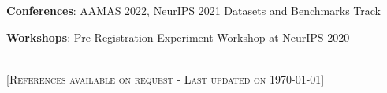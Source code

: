 \documentclass[]{lukas-cv-openfont}
\begin{document}
\noindent
\begin{tightitemize}{1.0em}
\item \textbf{Conferences}: AAMAS 2022, NeurIPS 2021 Datasets and Benchmarks Track
\item \textbf{Workshops}: Pre-Registration Experiment Workshop at NeurIPS 2020
\end{tightitemize}
\sectionsep


\ \\

[\scshape{}\fontsize{10pt}{8pt}\selectfont References available on request - Last updated on \today]
\end{document}
